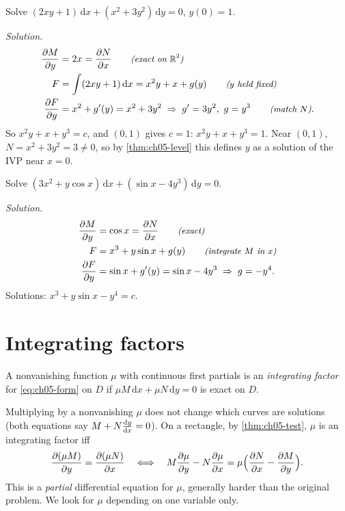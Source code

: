 \begin{example}\label{ex:ch05-motivation}
Solve $(2xy + 1)\,\mathrm{d}x + (x^2 + 3y^2)\,\mathrm{d}y = 0$, $y(0) = 1$.

\emph{Solution.}
\begin{align*}
  \frac{\partial M}{\partial y} &= 2x = \frac{\partial N}{\partial x} \qquad\text{\small\itshape(exact on $\mathbb{R}^2$)}\\
  F &= \int(2xy + 1)\,\mathrm{d}x = x^2y + x + g(y) \qquad\text{\small\itshape($y$ held fixed)}\\
  \frac{\partial F}{\partial y} &= x^2 + g'(y) = x^2 + 3y^2 \;\Rightarrow\; g' = 3y^2,\ g = y^3
     \qquad\text{\small\itshape(match $N$)}.
\end{align*}
So $x^2y + x + y^3 = c$, and $(0,1)$ gives $c = 1$:
$x^2y + x + y^3 = 1$. Near $(0,1)$, $N = x^2 + 3y^2 = 3\neq0$, so by
\cref{thm:ch05-level} this defines $y$ as a solution of the IVP near $x = 0$.
\end{example}

\begin{example}\label{ex:ch05-trig}
Solve $(3x^2 + y\cos x)\,\mathrm{d}x + (\sin x - 4y^3)\,\mathrm{d}y = 0$.

\emph{Solution.}
\begin{align*}
  \frac{\partial M}{\partial y} &= \cos x = \frac{\partial N}{\partial x} \qquad\text{\small\itshape(exact)}\\
  F &= x^3 + y\sin x + g(y) \qquad\text{\small\itshape(integrate $M$ in $x$)}\\
  \frac{\partial F}{\partial y} &= \sin x + g'(y) = \sin x - 4y^3 \;\Rightarrow\; g = -y^4 .
\end{align*}
Solutions: $x^3 + y\sin x - y^4 = c$.
\end{example}

\section{Integrating factors}\label{sec:ch05-integrating}

\begin{definition}\label{def:ch05-if}
A nonvanishing function $\mu$ with continuous first partials is an
\emph{integrating factor} for \eqref{eq:ch05-form} on $D$ if
$\mu M\,\mathrm{d}x + \mu N\,\mathrm{d}y = 0$ is exact on $D$.
\end{definition}

Multiplying by a nonvanishing $\mu$ does not change which curves are
solutions (both equations say $M + N\frac{\mathrm{d}y}{\mathrm{d}x} = 0$). On a rectangle, by
\cref{thm:ch05-test}, $\mu$ is an integrating factor iff
\begin{equation}\label{eq:ch05-if-pde}
  \frac{\partial (\mu M)}{\partial y} = \frac{\partial (\mu N)}{\partial x}
  \quad\Longleftrightarrow\quad
  M\frac{\partial \mu}{\partial y} - N\frac{\partial \mu}{\partial x} = \mu\Bigl(\frac{\partial N}{\partial x} - \frac{\partial M}{\partial y}\Bigr).
\end{equation}
This is a \emph{partial} differential equation for $\mu$, generally harder than
the original problem. We look for $\mu$ depending on one variable only.

